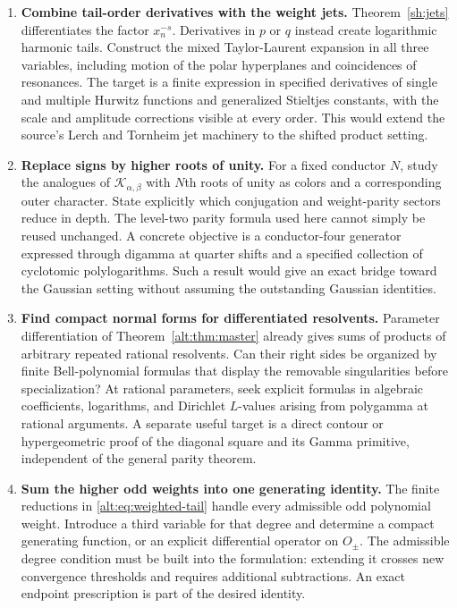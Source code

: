 \documentclass[11pt]{article}
\theoremstyle{definition}
\theoremstyle{remark}
\numberwithin{equation}{section}
\begin{document}
\begin{enumerate}[label=\textbf{Q\arabic*.},ref=Q\arabic*,itemsep=10pt]
\item \textbf{Combine tail-order derivatives with the weight jets.}
Theorem~\ref{sh:jets} differentiates the factor $x_n^{-s}$.
Derivatives in $p$ or $q$ instead create logarithmic harmonic tails.
Construct the mixed Taylor-Laurent expansion in all three variables,
including motion of the polar hyperplanes and coincidences of
resonances. The target is a finite expression in specified derivatives
of single and multiple Hurwitz functions and generalized Stieltjes
constants, with the scale and amplitude corrections visible at every
order. This would extend the source's Lerch and Tornheim jet machinery
to the shifted product setting.

\item \textbf{Replace signs by higher roots of unity.}
For a fixed conductor $N$, study the analogues of
$\mathcal K_{\alpha,\beta}$ with $N$th roots of unity as colors
and a corresponding outer character. State explicitly which
conjugation and weight-parity sectors reduce in depth. The level-two
parity formula used here cannot simply be reused unchanged. A
concrete objective is a conductor-four generator expressed through
digamma at quarter shifts and a specified collection of cyclotomic
polylogarithms. Such a result would give an exact bridge toward the
Gaussian setting without assuming the outstanding Gaussian identities.

\item \textbf{Find compact normal forms for differentiated resolvents.}
Parameter differentiation of Theorem~\ref{alt:thm:master} already
gives sums of products of arbitrary repeated rational resolvents.
Can their right sides be organized by finite Bell-polynomial formulas
that display the removable singularities before specialization?
At rational parameters, seek explicit formulas in algebraic
coefficients, logarithms, and Dirichlet $L$-values arising from
polygamma at rational arguments. A separate useful target is a direct
contour or hypergeometric proof of the diagonal square and its Gamma
primitive, independent of the general parity theorem.

\item \textbf{Sum the higher odd weights into one generating identity.}
The finite reductions in \eqref{alt:eq:weighted-tail} handle every
admissible odd polynomial weight. Introduce a third variable for
that degree and determine a compact generating function, or an
explicit differential operator on $O_\pm$. The admissible degree
condition must be built into the formulation: extending it crosses
new convergence thresholds and requires additional subtractions.
An exact endpoint prescription is part of the desired identity.


\end{enumerate}
\end{document}
